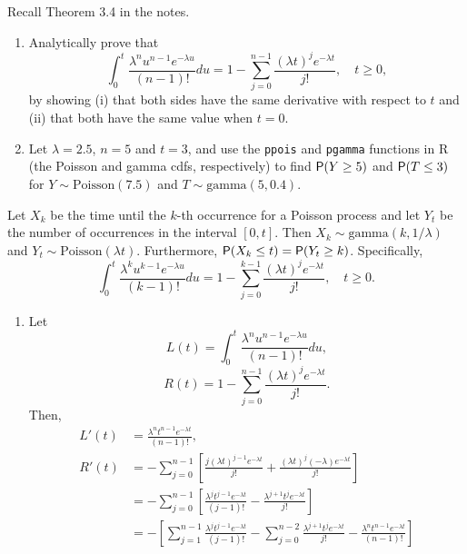 \documentclass[12pt]{article}
\newcommand{\Prob}{{\sf P}}
\newenvironment{theorem}[2][Theorem]{\begin{trivlist}
\item[\hskip \labelsep {\bfseries #1}\hskip \labelsep {\bfseries #2.}]}
{\end{trivlist}}
\newenvironment{problem}[2][Problem]{\begin{trivlist}
\item[\hskip \labelsep {\bfseries #1}\hskip \labelsep {\bfseries #2.}]}
{\end{trivlist}}
\begin{document}
\begin{problem}{6}
Recall Theorem 3.4 in the notes.
  \begin{enumerate}
    \item Analytically prove that
    \[
      \int_0^t \frac{\lambda^n u^{n-1} e^{-\lambda u}}{(n-1)!} du 
      = 1 - \sum_{j=0}^{n-1} \frac{(\lambda t)^j e^{-\lambda t}}{j!}, 
      \quad t \geq 0,
    \]
    by showing (i) that both sides have the same derivative with 
    respect to $t$ and (ii) that both have the same value when $t = 0$.
    \item Let $\lambda = 2.5$, $n = 5$ and $t = 3$, and use the 
    \texttt{ppois} and \texttt{pgamma} functions in R (the Poisson
    and gamma cdfs, respectively) to find $\Prob(Y \geq 5)$ and 
    $\Prob(T \leq 3)$ for $Y \sim \text{Poisson}(7.5)$ and
    $T \sim \text{gamma}(5, 0.4)$.
  \end{enumerate}
  \begin{theorem}{3.4}
    Let $X_k$ be the time until the $k$-th occurrence for a Poisson
    process and let $Y_t$ be the number of occurrences in the 
    interval $[0, t]$. Then $X_k \sim \text{gamma}(k, 1/\lambda)$ and 
    $Y_t \sim \text{Poisson}(\lambda t)$. Furthermore,
    $\Prob(X_k \leq t) = \Prob(Y_t \geq k)$.
    Specifically,
    \[
      \int_0^t \frac{\lambda^k u^{k-1} e^{-\lambda u}}{(k-1)!} du = 
      1 - \sum_{j=0}^{k-1} \frac{(\lambda t)^j e^{-\lambda t}}{j!}, 
      \quad t \geq 0.
    \]
  \end{theorem}
  \begin{enumerate}
    \item Let
    \[
      L(t) = \int_0^t \frac{\lambda^n u^{n-1} e^{-\lambda u}}{(n-1)!} du,
    \]
    \[
      R(t) = 1 - \sum_{j=0}^{n-1} \frac{(\lambda t)^j e^{-\lambda t}}{j!}.
    \]
    Then,
    \[
      \begin{aligned}
        L'(t) &= \frac{\lambda^n t^{n-1} e^{-\lambda t}}{(n-1)!}, \\
        R'(t) &= -\sum_{j=0}^{n-1} \left[ \frac{j(\lambda t)^{j-1} e^{-\lambda t}}{j!} 
        + \frac{(\lambda t)^j (-\lambda) e^{-\lambda t}}{j!} \right] \\
        &= -\sum_{j=0}^{n-1} \left[ \frac{\lambda^j t^{j-1} e^{-\lambda t}}{(j-1)!} 
        - \frac{\lambda^{j+1} t^j e^{-\lambda t}}{j!} \right] \\
        &= -\left[ \sum_{j=1}^{n-1} \frac{\lambda^j t^{j-1} e^{-\lambda t}}{(j-1)!} 
        - \sum_{j=0}^{n-2} \frac{\lambda^{j+1} t^j e^{-\lambda t}}{j!} 
        - \frac{\lambda^n t^{n-1} e^{-\lambda t}}{(n-1)!} \right] \\

\end{aligned}\]
\end{enumerate}
\end{problem}
\end{document}
